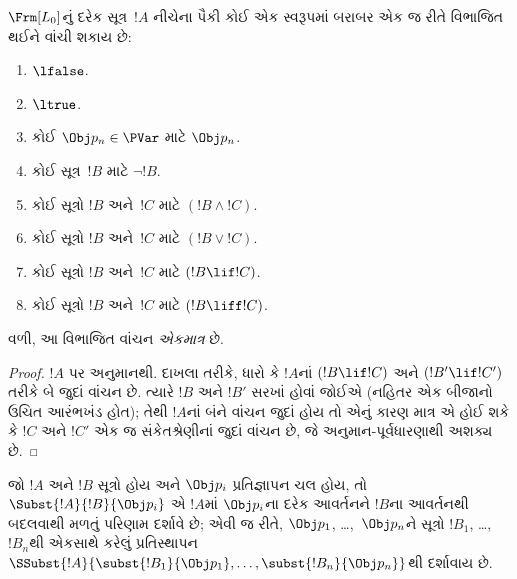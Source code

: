 \begin{prop}[એકમાત્ર વાચનીયતા]
$\Frm[L_0]$નું દરેક સૂત્ર~$!A$ નીચેના પૈકી કોઈ એક સ્વરૂપમાં
બરાબર એક જ રીતે વિભાજિત થઈને વાંચી શકાય છે:
\begin{enumerate}
\item $\lfalse$.

\item $\ltrue$.

\item કોઈ $\Obj p_n \in \PVar$ માટે $\Obj p_n$.

\item કોઈ સૂત્ર~$!B$ માટે $\lnot !B$.

\item કોઈ સૂત્રો $!B$ અને~$!C$ માટે
$(!B \land !C)$.

\item કોઈ સૂત્રો $!B$ અને~$!C$ માટે
$(!B \lor !C)$.

\item કોઈ સૂત્રો $!B$ અને~$!C$ માટે
$(!B \lif !C)$.

\item કોઈ સૂત્રો $!B$ અને~$!C$ માટે
$(!B \liff !C)$.
\end{enumerate}
વળી, આ વિભાજિત વાંચન \emph{એકમાત્ર} છે.
\end{prop}

\begin{proof}
$!A$ પર અનુમાનથી. દાખલા તરીકે, ધારો કે $!A$નાં $(!B \lif !C)$ અને
$(!B' \lif !C')$ તરીકે બે જુદાં વાંચન છે. ત્યારે $!B$ અને $!B'$ સરખાં
હોવાં જોઈએ (નહિતર એક બીજાનો ઉચિત આરંભખંડ હોત); તેથી $!A$નાં બંને
વાંચન જુદાં હોય તો એનું કારણ માત્ર એ હોઈ શકે કે $!C$ અને $!C'$ એક જ
સંકેતશ્રેણીનાં જુદાં વાંચન છે, જે અનુમાન-પૂર્વધારણાથી અશક્ય છે.
\end{proof}


\begin{defn}[એકરૂપ પ્રતિસ્થાપન]
જો $!A$ અને $!B$ સૂત્રો હોય અને $\Obj p_i$ પ્રતિજ્ઞાપન ચલ હોય, તો $\Subst{!A}{!B}{\Obj p_i}$ એ $!A$માં $\Obj p_i$ના
દરેક આવર્તનને $!B$ના આવર્તનથી બદલવાથી મળતું પરિણામ દર્શાવે છે;
એવી જ રીતે, $\Obj p_1$, \dots,~$\Obj p_n$ને સૂત્રો $!B_1$,
\dots,~$!B_n$થી એકસાથે કરેલું પ્રતિસ્થાપન
$\SSubst{!A}{\subst{!B_1}{\Obj p_1},\dots,\subst{!B_n}{\Obj p_n}}$થી
દર્શાવાય છે.
\end{defn}

